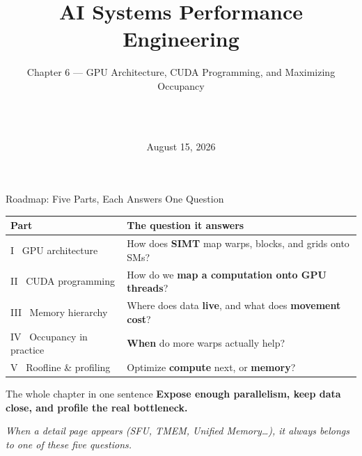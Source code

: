 \documentclass[aspectratio=169]{beamer}
\title[AI Systems Performance Engineering]{AI Systems Performance Engineering}
\subtitle{Chapter 6 --- GPU Architecture, CUDA Programming, and Maximizing Occupancy}
\author[\PresenterName\ \ \PresenterTitle\ \ \PresenterOrg]{\PresenterName\\\PresenterTitle\\\PresenterOrg}
\institute[]{\footnotesize Internal Training for Applied Scientists on AI Infrastructure}
\date{August 15, 2026}
\newcommand{\kw}[1]{\textbf{\textcolor{kwblue}{#1}}}
\begin{document}
\begin{frame}
  \titlepage
\end{frame}

\begin{frame}{Roadmap: Five Parts, Each Answers One Question}
  \begingroup\small\setlength{\tabcolsep}{6pt}\renewcommand{\arraystretch}{1.25}
  \begin{tabular}{@{}ll@{}}
    \toprule
    \textbf{Part} & \textbf{The question it answers} \\
    \midrule
    I \ GPU architecture & How does \kw{SIMT} map warps, blocks, and grids onto SMs? \\
    II \ CUDA programming & How do we \kw{map a computation onto GPU threads}? \\
    III \ Memory hierarchy & Where does data \kw{live}, and what does \kw{movement cost}? \\
    IV \ Occupancy in practice & \kw{When} do more warps actually help? \\
    V \ Roofline \& profiling & Optimize \kw{compute} next, or \kw{memory}? \\
    \bottomrule
  \end{tabular}\endgroup
  \bigskip
  \begin{block}{The whole chapter in one sentence}
    \centering \kw{Expose enough parallelism, keep data close, and profile the real bottleneck.}
  \end{block}
  \medskip
  \centering\footnotesize\itshape
  When a detail page appears (SFU, TMEM, Unified Memory\ldots), it always belongs to one of these five questions.
\end{frame}
\end{document}
